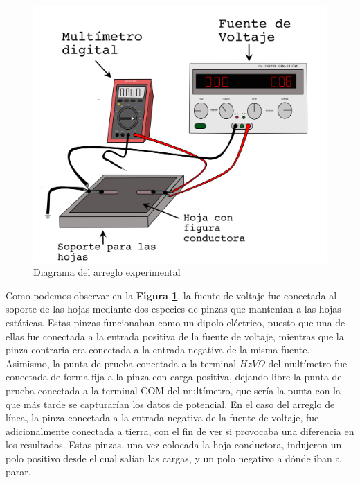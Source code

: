 \documentclass[letterpaper, 11 pt]{article}
\begin{document}
\begin{multicols}{2}
\begin{figure}[H]
    \captionsetup{justification=centering,margin=0.5cm}
    \includegraphics[scale=0.15]{soyputo2.png}
    \centering
    \caption{Diagrama del arreglo experimental}
    \label{arreglo}
\end{figure}




Como podemos observar en la \textbf{Figura \ref{arreglo}}, la fuente de voltaje fue conectada al soporte de las hojas mediante dos especies de  pinzas que mantenían a las hojas estáticas. Estas pinzas funcionaban como un dipolo eléctrico, puesto que una de ellas fue conectada a la entrada positiva de la fuente de voltaje, mientras que la pinza contraria era conectada a la entrada negativa de la misma fuente. Asimismo, la punta de prueba conectada a la terminal $HzV\Omega$ del multímetro fue conectada de forma fija a la pinza con carga positiva, dejando libre la punta de prueba conectada a la terminal COM del multímetro, que sería la punta con la que más tarde se capturarían los datos de potencial. En el caso del arreglo de línea, la pinza conectada a la entrada negativa de la fuente de voltaje, fue adicionalmente conectada a tierra, con el fin de ver si provocaba una diferencia en los resultados. Estas pinzas, una vez colocada la hoja conductora, indujeron un polo positivo desde el cual salían las cargas, y un polo negativo a dónde iban a parar.



\end{multicols}
\end{document}
